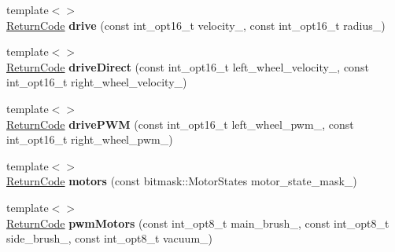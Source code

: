 \begin{DoxyCompactItemize}
\item 
\hypertarget{classroomba_1_1_open_interface_acb4a5d06e0254fe5d6be022f7d20b2f7}{{\footnotesize template$<$$>$ }\\\hyperlink{namespaceroomba_aff53babe0af88b1ea8b066fd18b8f23f}{Return\+Code} {\bfseries drive} (const int\+\_\+opt16\+\_\+t velocity\+\_\+, const int\+\_\+opt16\+\_\+t radius\+\_\+)}\label{classroomba_1_1_open_interface_acb4a5d06e0254fe5d6be022f7d20b2f7}

\item 
\hypertarget{classroomba_1_1_open_interface_a1c34383ac37b1ce493179c40c36209ab}{{\footnotesize template$<$$>$ }\\\hyperlink{namespaceroomba_aff53babe0af88b1ea8b066fd18b8f23f}{Return\+Code} {\bfseries drive\+Direct} (const int\+\_\+opt16\+\_\+t left\+\_\+wheel\+\_\+velocity\+\_\+, const int\+\_\+opt16\+\_\+t right\+\_\+wheel\+\_\+velocity\+\_\+)}\label{classroomba_1_1_open_interface_a1c34383ac37b1ce493179c40c36209ab}

\item 
\hypertarget{classroomba_1_1_open_interface_a7fd9c7802dd1db62515ce7a6b7f60edc}{{\footnotesize template$<$$>$ }\\\hyperlink{namespaceroomba_aff53babe0af88b1ea8b066fd18b8f23f}{Return\+Code} {\bfseries drive\+P\+W\+M} (const int\+\_\+opt16\+\_\+t left\+\_\+wheel\+\_\+pwm\+\_\+, const int\+\_\+opt16\+\_\+t right\+\_\+wheel\+\_\+pwm\+\_\+)}\label{classroomba_1_1_open_interface_a7fd9c7802dd1db62515ce7a6b7f60edc}

\item 
\hypertarget{classroomba_1_1_open_interface_a8d5903a81ffa80c67673a1748853f499}{{\footnotesize template$<$$>$ }\\\hyperlink{namespaceroomba_aff53babe0af88b1ea8b066fd18b8f23f}{Return\+Code} {\bfseries motors} (const bitmask\+::\+Motor\+States motor\+\_\+state\+\_\+mask\+\_\+)}\label{classroomba_1_1_open_interface_a8d5903a81ffa80c67673a1748853f499}

\item 
\hypertarget{classroomba_1_1_open_interface_a8cd1c98cea0c253e3eb3d35c4b8244af}{{\footnotesize template$<$$>$ }\\\hyperlink{namespaceroomba_aff53babe0af88b1ea8b066fd18b8f23f}{Return\+Code} {\bfseries pwm\+Motors} (const int\+\_\+opt8\+\_\+t main\+\_\+brush\+\_\+, const int\+\_\+opt8\+\_\+t side\+\_\+brush\+\_\+, const int\+\_\+opt8\+\_\+t vacuum\+\_\+)}\label{classroomba_1_1_open_interface_a8cd1c98cea0c253e3eb3d35c4b8244af}


\end{DoxyCompactItemize}
